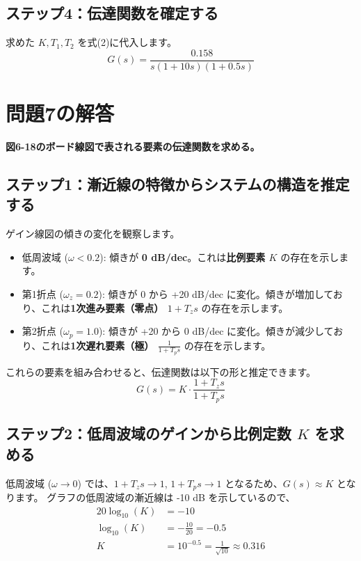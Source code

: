 \documentclass[11pt,a4paper]{ltjsarticle} %
\begin{document}
\subsection*{ステップ4：伝達関数を確定する}
求めた $K, T_1, T_2$ を式(2)に代入します。
\begin{equation}
    G(s) = \frac{0.158}{s(1+10s)(1+0.5s)}
\end{equation}

\section{問題7の解答}
\textbf{図6-18のボード線図で表される要素の伝達関数を求める。}

\subsection*{ステップ1：漸近線の特徴からシステムの構造を推定する}
ゲイン線図の傾きの変化を観察します。
\begin{itemize}
    \item 低周波域 ($\omega < 0.2$): 傾きが \textbf{0 dB/dec}。これは\textbf{比例要素 $K$} の存在を示します。
    \item 第1折点 ($\omega_{z} = 0.2$): 傾きが 0 から +20 dB/dec に変化。傾きが増加しており、これは\textbf{1次進み要素（零点） $1+T_z s$} の存在を示します。
    \item 第2折点 ($\omega_{p} = 1.0$): 傾きが +20 から 0 dB/dec に変化。傾きが減少しており、これは\textbf{1次遅れ要素（極） $\frac{1}{1+T_p s}$} の存在を示します。
\end{itemize}
これらの要素を組み合わせると、伝達関数は以下の形と推定できます。
\begin{equation}
    G(s) = K \cdot \frac{1+T_z s}{1+T_p s}
\end{equation}

\subsection*{ステップ2：低周波域のゲインから比例定数 $K$ を求める}
低周波域 ($\omega \to 0$) では、$1+T_z s \to 1$, $1+T_p s \to 1$ となるため、$G(s) \approx K$ となります。
グラフの低周波域の漸近線は -10 dB を示しているので、
\begin{align*}
    20 \log_{10}(K) &= -10 \\
    \log_{10}(K) &= -\frac{10}{20} = -0.5 \\
    K &= 10^{-0.5} = \frac{1}{\sqrt{10}} \approx 0.316
\end{align*}
\end{document}
